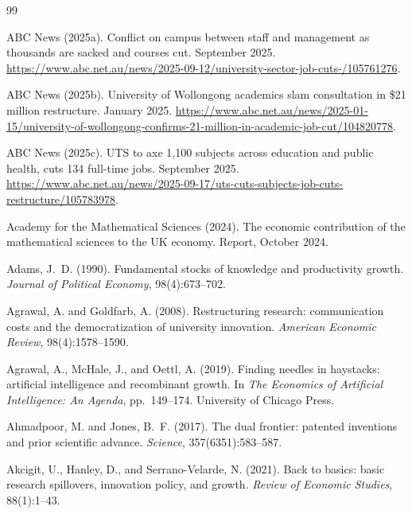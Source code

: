 \documentclass[11pt]{article}
\theoremstyle{definition}
\theoremstyle{remark}
\begin{document}
\begin{thebibliography}{99}

ABC News (2025a).
\newblock Conflict on campus between staff and management as thousands are sacked and courses cut.
 September 2025. \url{https://www.abc.net.au/news/2025-09-12/university-sector-job-cuts-/105761276}.

ABC News (2025b).
\newblock University of Wollongong academics slam consultation in \$21 million restructure.
 January 2025. \url{https://www.abc.net.au/news/2025-01-15/university-of-wollongong-confirms-21-million-in-academic-job-cut/104820778}.

ABC News (2025c).
\newblock UTS to axe 1,100 subjects across education and public health, cuts 134 full-time jobs.
 September 2025. \url{https://www.abc.net.au/news/2025-09-17/uts-cuts-subjects-job-cuts-restructure/105783978}.

Academy for the Mathematical Sciences (2024).
\newblock The economic contribution of the mathematical sciences to the UK economy.
\newblock Report, October 2024.

Adams, J.~D. (1990).
\newblock Fundamental stocks of knowledge and productivity growth.
\newblock \emph{Journal of Political Economy}, 98(4):673--702.

Agrawal, A. and Goldfarb, A. (2008).
\newblock Restructuring research: communication costs and the democratization of university innovation.
\newblock \emph{American Economic Review}, 98(4):1578--1590.

Agrawal, A., McHale, J., and Oettl, A. (2019).
\newblock Finding needles in haystacks: artificial intelligence and recombinant growth.
\newblock In \emph{The Economics of Artificial Intelligence: An Agenda}, pp.\ 149--174. University of Chicago Press.

Ahmadpoor, M. and Jones, B.~F. (2017).
\newblock The dual frontier: patented inventions and prior scientific advance.
\newblock \emph{Science}, 357(6351):583--587.

Akcigit, U., Hanley, D., and Serrano-Velarde, N. (2021).
\newblock Back to basics: basic research spillovers, innovation policy, and growth.
\newblock \emph{Review of Economic Studies}, 88(1):1--43.


\end{thebibliography}
\end{document}

